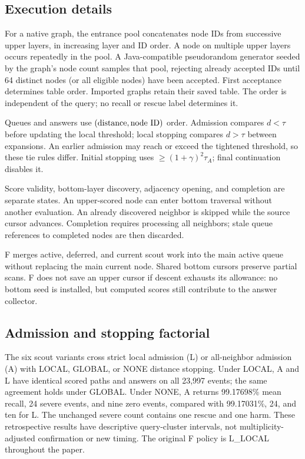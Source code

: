 \subsection{Execution details}
\label{app:execution}

For a native graph, the entrance pool concatenates node IDs from successive
upper layers, in increasing layer and ID order. A node on multiple upper
layers occurs repeatedly in the pool. A Java-compatible pseudorandom
generator seeded by the graph's node count samples that pool, rejecting
already accepted IDs until 64 distinct nodes (or all eligible nodes) have
been accepted. First acceptance determines table order. Imported graphs
retain their saved table. The order is independent of the query; no
recall or rescue label determines it.

Queues and answers use $(\hbox{distance},\hbox{node ID})$ order.
Admission compares $d<\tau$ before updating the local threshold;
local stopping compares $d>\tau$ between expansions.
An earlier admission may reach or exceed the tightened threshold, so
these tie rules differ. Initial stopping uses $\geq(1+\gamma)^2\tau_A$;
final continuation disables it.

Score validity, bottom-layer discovery, adjacency opening, and completion
are separate states. An upper-scored node can enter bottom traversal
without another evaluation. An already discovered neighbor is skipped
while the source cursor advances. Completion requires processing all
neighbors; stale queue references to completed nodes are then discarded.

F merges active, deferred, and current scout work into the main active
queue without replacing the main current node. Shared bottom cursors
preserve partial scans. F does not save an upper cursor if descent
exhausts its allowance: no bottom seed is installed, but computed scores
still contribute to the answer collector.

\subsection{Admission and stopping factorial}\label{app:factorial}
The six scout variants cross strict local admission (L) or all-neighbor
admission (A) with LOCAL, GLOBAL, or NONE distance stopping. Under LOCAL,
A and L have identical scored paths and answers on all 23,997 events;
the same agreement holds under GLOBAL. Under NONE, A returns 99.17698\%
mean recall, 24 severe events, and nine zero events, compared with
99.17031\%, 24, and ten for L. The unchanged severe count contains one
rescue and one harm. These retrospective results have descriptive
query-cluster intervals, not multiplicity-adjusted confirmation or new
timing. The original F policy is L\_LOCAL throughout the paper.

